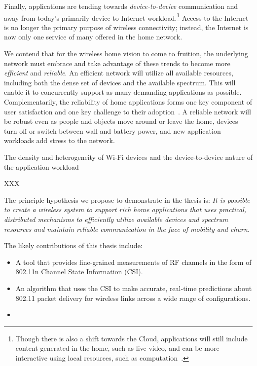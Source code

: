 Finally, applications are tending towards \emph{device-to-device} communication and away from today's primarily device-to-Internet workload.\footnote{Though there is also a shift towards the Cloud, applications will still include content generated in the home, such as live video, and can be more interactive using local resources, such as computation~\cite{satya_cloudlets}.} Access to the Internet is no longer the primary purpose of wireless connectivity; instead, the Internet is now only one service of many offered in the home network.

We contend that for the wireless home vision to come to fruition, the underlying network must embrace and take advantage of these trends to become more \emph{efficient} and \emph{reliable}. An efficient network will utilize all available resources, including both the dense set of devices and the available spectrum. This will enable it to concurrently support as many demanding applications as possible.
Complementarily, the reliability of home applications forms one key component of user satisfaction and one key challenge to their adoption~\cite{edwards_challenges}. A reliable network will be robust even as people and objects move around or leave the home, devices turn off or switch between wall and battery power, and new application workloads add stress to the network.

The density and heterogeneity of Wi-Fi devices and the device-to-device nature of the application workload

XXX


The principle hypothesis we propose to demonstrate in the thesis is: \emph{It is possible to create a wireless system to support rich home applications that uses practical, distributed mechanisms to efficiently utilize available devices and spectrum resources and maintain reliable communication in the face of mobility and churn.}

The likely contributions of this thesis include:
\begin{itemize}
\item A tool that provides fine-grained measurements of RF channels in the form of 802.11n Channel State Information (CSI).
\item An algorithm that uses the CSI to make accurate, real-time predictions about 802.11 packet delivery for wireless links across a wide range of configurations.
\item 
\end{itemize}

